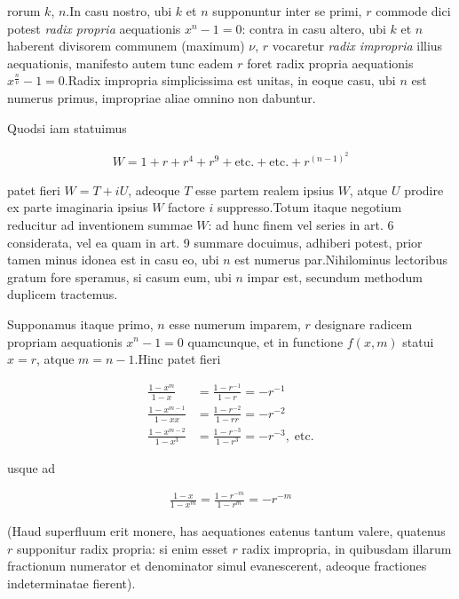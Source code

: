 rorum $k$, $n$.\quad In casu nostro, ubi $k$ et $n$ supponuntur inter se primi, $r$ commode dici potest \emph{radix propria} aequationis $x^n-1=0$: contra in casu altero, ubi $k$ et $n$ haberent divisorem communem (maximum) $\nu$, $r$ vocaretur \emph{radix impropria} illius aequationis, manifesto autem tunc eadem $r$ foret radix propria aequationis $x^{\frac n\nu}-1=0$.\quad Radix impropria simplicissima est unitas, in eoque casu, ubi $n$ est numerus primus, impropriae aliae omnino non dabuntur.


Quodsi iam statuimus

\[
\begin{aligned}
W=1+r+r^4+r^9+\text{etc.}+\text{etc.}+r^{(n-1)^2}
\end{aligned}
\]

patet fieri $W=T+iU$, adeoque $T$ esse partem realem ipsius $W$, atque $U$ prodire ex parte imaginaria ipsius $W$ factore $i$ suppresso.\quad Totum itaque negotium reducitur ad inventionem summae $W$: ad hunc finem vel series in art. 6 considerata, vel ea quam in art. 9 summare docuimus, adhiberi potest, prior tamen minus idonea est in casu eo, ubi $n$ est numerus par.\quad Nihilominus lectoribus gratum fore speramus, si casum eum, ubi $n$ impar est, secundum methodum duplicem tractemus.

Supponamus itaque primo, $n$ esse numerum imparem, $r$ designare radicem propriam aequationis $x^n-1=0$ quamcunque, et in functione $f(x,m)$ statui $x=r$, atque $m=n-1$.\quad Hinc patet fieri

\[
\begin{aligned}
\frac{1-x^m}{1-x}&=\frac{1-r^{-1}}{1-r}=-r^{-1}\\
\frac{1-x^{m-1}}{1-xx}&=\frac{1-r^{-2}}{1-rr}=-r^{-2}\\
\frac{1-x^{m-2}}{1-x^3}&=\frac{1-r^{-3}}{1-r^3}=-r^{-3},\;\text{etc.}
\end{aligned}
\]

usque ad

\[
\begin{aligned}
\frac{1-x}{1-x^m}=\frac{1-r^{-m}}{1-r^m}=-r^{-m}
\end{aligned}
\]

(Haud superfluum erit monere, has aequationes eatenus tantum valere, quatenus $r$ supponitur radix propria: si enim esset $r$ radix impropria, in quibusdam illarum fractionum numerator et denominator simul evanescerent, adeoque fractiones indeterminatae fierent).

